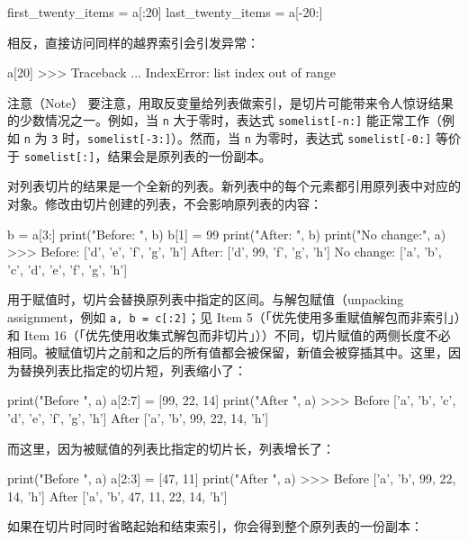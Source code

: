 \begin{codebox}[python]
first_twenty_items = a[:20]
last_twenty_items = a[-20:]
\end{codebox}

相反，直接访问同样的越界索引会引发异常：

\begin{codebox}[python]
a[20]
>>>
Traceback ...
IndexError: list index out of range
\end{codebox}

注意（Note）
要注意，用取反变量给列表做索引，是切片可能带来令人惊讶结果的少数情况之一。例如，当 \texttt{n} 大于零时，表达式 \texttt{somelist[-n:]} 能正常工作（例如 \texttt{n} 为 \texttt{3} 时，\texttt{somelist[-3:]}）。然而，当 \texttt{n} 为零时，表达式 \texttt{somelist[-0:]} 等价于 \texttt{somelist[:]}，结果会是原列表的一份副本。

对列表切片的结果是一个全新的列表。新列表中的每个元素都引用原列表中对应的对象。修改由切片创建的列表，不会影响原列表的内容：

\begin{codebox}[python]
b = a[3:]
print("Before:   ", b)
b[1] = 99
print("After:    ", b)
print("No change:", a)
>>>
Before:    ['d', 'e', 'f', 'g', 'h']
After:     ['d', 99, 'f', 'g', 'h']
No change: ['a', 'b', 'c', 'd', 'e', 'f', 'g', 'h']
\end{codebox}

用于赋值时，切片会替换原列表中指定的区间。与解包赋值（unpacking assignment，例如 \texttt{a, b = c[:2]}；见 Item 5（「优先使用多重赋值解包而非索引」）和 Item 16（「优先使用收集式解包而非切片」））不同，切片赋值的两侧长度不必相同。被赋值切片之前和之后的所有值都会被保留，新值会被穿插其中。这里，因为替换列表比指定的切片短，列表缩小了：

\begin{codebox}[python]
print("Before ", a)
a[2:7] = [99, 22, 14]
print("After  ", a)
>>>
Before  ['a', 'b', 'c', 'd', 'e', 'f', 'g', 'h']
After   ['a', 'b', 99, 22, 14, 'h']
\end{codebox}

而这里，因为被赋值的列表比指定的切片长，列表增长了：

\begin{codebox}[python]
print("Before ", a)
a[2:3] = [47, 11]
print("After  ", a)
>>>
Before  ['a', 'b', 99, 22, 14, 'h']
After   ['a', 'b', 47, 11, 22, 14, 'h']
\end{codebox}

如果在切片时同时省略起始和结束索引，你会得到整个原列表的一份副本：

